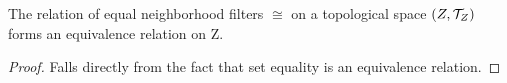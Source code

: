 
\begin{prop}
    \label{prop:EqualNeighborhoodFiltersEquivalenceRelation}
    
    The relation of equal neighborhood filters $\cong$ on a topological space $(Z,\mathcal{T}_Z)$ forms an equivalence relation on Z. 
    \begin{proof}
        Falls directly from the fact that set equality is an equivalence relation. 
    \end{proof}
\end{prop}